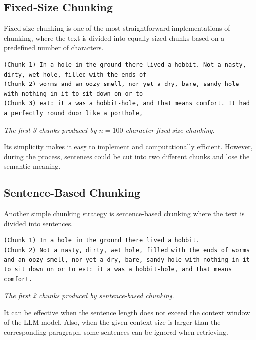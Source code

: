 \documentclass[conference]{IEEEtran}
\begin{document}
\subsection{Fixed-Size Chunking}
Fixed-size chunking is one of the most straightforward implementations of chunking, where the text is divided into equally sized chunks based on a predefined number of characters. 
\footnotesize
\begin{tcolorbox}[colback=gray!15, colframe=gray!75, arc=8mm]
\begin{lstlisting}[breaklines=true, columns=fullflexible]
(Chunk 1) In a hole in the ground there lived a hobbit. Not a nasty, dirty, wet hole, filled with the ends of
(Chunk 2) worms and an oozy smell, nor yet a dry, bare, sandy hole with nothing in it to sit down on or to
(Chunk 3) eat: it a was a hobbit-hole, and that means comfort. It had a perfectly round door like a porthole,
\end{lstlisting}
\end{tcolorbox}
\begin{center}
\textit{The first 3 chunks produced by $n=100$ character fixed-size chunking.}
\end{center}
\normalsize
 Its simplicity makes it easy to implement and computationally efficient. However, during the process, sentences could be cut into two different chunks and lose the semantic meaning.

\subsection{Sentence-Based Chunking}
Another simple chunking strategy is sentence-based chunking where the text is divided into sentences.
\footnotesize
\begin{tcolorbox}[colback=gray!15, colframe=gray!75, arc=8mm]
\begin{lstlisting}[breaklines=true, columns=fullflexible]
(Chunk 1) In a hole in the ground there lived a hobbit.
(Chunk 2) Not a nasty, dirty, wet hole, filled with the ends of worms and an oozy smell, nor yet a dry, bare, sandy hole with nothing in it to sit down on or to eat: it a was a hobbit-hole, and that means comfort.
\end{lstlisting}
\end{tcolorbox}
\begin{center}
\textit{The first 2 chunks produced by sentence-based chunking.}
\end{center}
\normalsize
 It can be effective when the sentence length does not exceed the context window of the LLM model. Also, when the given context size is larger than the corresponding paragraph, some sentences can be ignored when retrieving.
\end{document}
